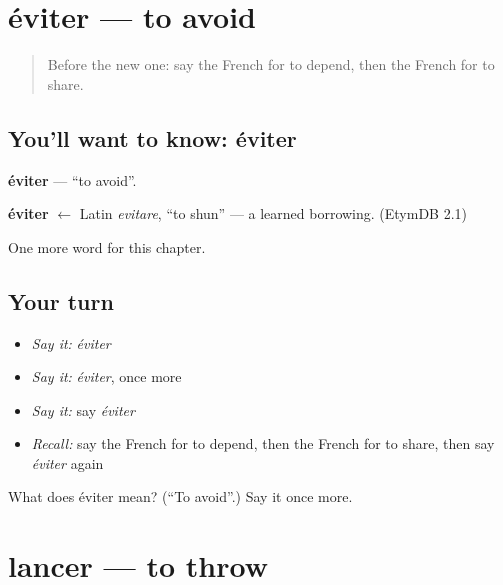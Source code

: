 \section[éviter]{éviter — to avoid}

\label{lesson:FR-C179-eviter}



\begin{quote}
Before the new one: say the French for to depend, then the French for to share.
\end{quote}

\subsection*{You'll want to know: éviter}
\textbf{éviter} — \textquotedblleft{}to avoid\textquotedblright{}.

\begin{cousinweb}
\textbf{éviter} $\leftarrow$ Latin \emph{evitare}, \textquotedblleft{}to shun\textquotedblright{} — a learned borrowing. (EtymDB 2.1)
\end{cousinweb}

\begin{grammarlens}[title={What you've built}]
One more word for this chapter.
\end{grammarlens}

\subsection*{Your turn}
\begin{itemize}
\raggedright
  \item \emph{Say it:} \emph{éviter}
  \item \emph{Say it:} \emph{éviter}, once more
  \item \emph{Say it:} say \emph{éviter}
  \item \emph{Recall:} say the French for to depend, then the French for to share, then say \emph{éviter} again
\end{itemize}

\begin{tcolorbox}[breakable,colback=teal!4,colframe=teal!35!black,title={Before you move on}]
What does éviter mean? (\textquotedblleft{}To avoid\textquotedblright{}.) Say it once more.
\end{tcolorbox}
\section[lancer]{lancer — to throw}

